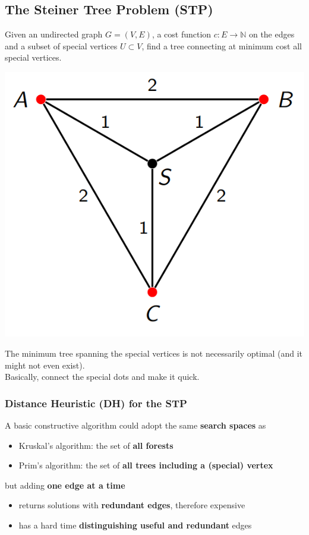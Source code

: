 \documentclass[11pt]{article}
\begin{document}
	\newpage
	
	\subsection{The Steiner Tree Problem (STP)}
	Given an undirected graph $G = (V , E )$, a cost function $c : E \rightarrow \mathbb{N}$ on the edges and a subset of special vertices $U \subset V$, find a tree connecting at minimum cost all special vertices.
	\begin{center}
		\includegraphics[width=0.6\columnwidth]{img/STP1}
	\end{center}
	The minimum tree spanning the special vertices is not necessarily optimal (and it might not even exist).\\
	
	Basically, connect the special dots and make it quick.\\
	
	\newpage
	
	\subsubsection{Distance Heuristic (DH) for the STP}
	A basic constructive algorithm could adopt the same \textbf{search spaces} as
	\begin{itemize}
		\item Kruskal's algorithm: the set of \textbf{all forests}
		\item Prim's algorithm: the set of \textbf{all trees including a (special) vertex}
	\end{itemize}
	
	but adding \textbf{one edge at a time}
	\begin{itemize}
		\item returns solutions with \textbf{redundant edges}, therefore expensive
		\item has a hard time \textbf{distinguishing useful and redundant} edges
	\end{itemize}
	
\end{document}
